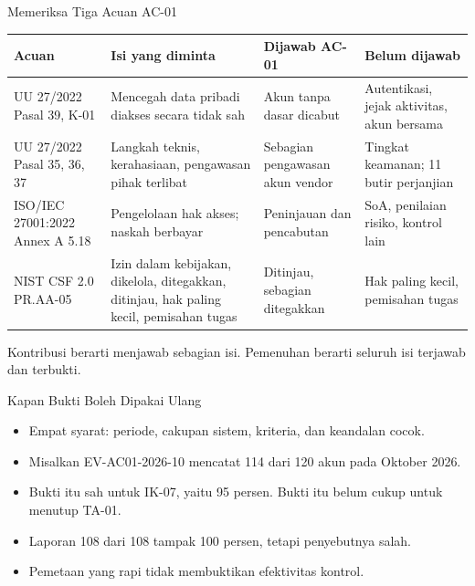 \documentclass[aspectratio=169, table, 12pt]{beamer}
\begin{document}
\begin{frame}{{\Large Memeriksa Tiga Acuan AC-01}}
  \vspace{2pt}
  \scriptsize
  \begin{tabularx}{\textwidth}{|>{\raggedright\arraybackslash}p{}|>{\raggedright\arraybackslash}X|>{\raggedright\arraybackslash}p{}|>{\raggedright\arraybackslash}p{}|}
    \hline
    \textbf{Acuan} & \textbf{Isi yang diminta} & \textbf{Dijawab AC-01} & \textbf{Belum dijawab} \\
    \hline
    UU 27/2022 Pasal 39, K-01 & Mencegah data pribadi diakses secara tidak sah & Akun tanpa dasar
    dicabut & Autentikasi, jejak aktivitas, akun bersama \\ \hline
    UU 27/2022 Pasal 35, 36, 37 & Langkah teknis, kerahasiaan, pengawasan pihak terlibat & Sebagian
    pengawasan akun vendor & Tingkat keamanan; 11 butir perjanjian \\ \hline
    ISO/IEC 27001:2022 Annex A 5.18 & Pengelolaan hak akses; naskah berbayar & Peninjauan dan
    pencabutan & SoA, penilaian risiko, kontrol lain \\ \hline
    NIST CSF 2.0 PR.AA-05 & Izin dalam kebijakan, dikelola, ditegakkan, ditinjau, hak paling kecil,
    pemisahan tugas & Ditinjau, sebagian ditegakkan & Hak paling kecil, pemisahan tugas \\ \hline
  \end{tabularx}

  \vspace{6pt}
  \small Kontribusi berarti menjawab sebagian isi. Pemenuhan berarti seluruh isi terjawab dan terbukti.
\end{frame}

\begin{frame}{{\Large Kapan Bukti Boleh Dipakai Ulang}}
  \vspace{6pt}
  \small
  \begin{itemize}
    \item Empat syarat: periode, cakupan sistem, kriteria, dan keandalan cocok.
    \item Misalkan EV-AC01-2026-10 mencatat 114 dari 120 akun pada Oktober 2026.
    \item Bukti itu sah untuk IK-07, yaitu 95 persen. Bukti itu belum cukup untuk menutup TA-01.
    \item Laporan 108 dari 108 tampak 100 persen, tetapi penyebutnya salah.
    \item Pemetaan yang rapi tidak membuktikan efektivitas kontrol.
  \end{itemize}
\end{frame}
\end{document}
